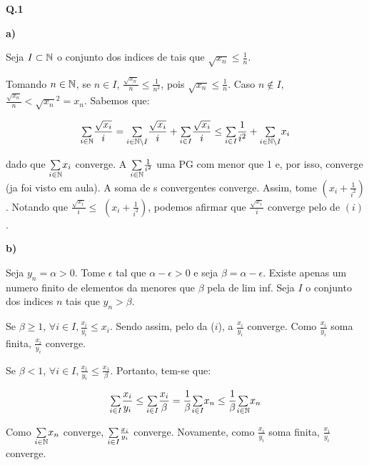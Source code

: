 \noindent\textbf{Q.1}

\textbf{a)}

Seja $I \subset \mathbb{N}$ o conjunto dos indices de  tais que $\sqrt{x_n} \leq \frac{1}{n}$.

Tomando $n \in \mathbb{N}$, se $n\in I$, \entao $\frac{\sqrt{x_n}}{n} \leq \frac{1}{n^2}$, pois $\sqrt{x_n} \leq \frac{1}{n}$. Caso $n \notin I$, \entao $\frac{\sqrt{x_n}}{n} < \sqrt{x_n}^2 = x_n$. Sabemos \entao que:

$$\mbox{$\sum\limits_{i \in \mathbb{N}}$}\frac{\sqrt{x_i}}{i} = \mbox{$\sum\limits_{i \in \mathbb{N} \setminus I}$}\frac{\sqrt{x_i}}{i} + \mbox{$\sum\limits_{i \in I}$}\frac{\sqrt{x_i}}{i} \leq \mbox{$\sum\limits_{i \in I}$}\frac{1}{i^2} + \mbox{$\sum\limits_{i \in \mathbb{N}\setminus I}$}x_i$$

\Eh dado que $\mbox{$\sum\limits_{i \in \mathbb{N}}$}x_i$ converge. A \serie $\mbox{$\sum\limits_{i \in \mathbb{N}}$}\frac{1}{i^2}$ \eh uma PG com \razao menor que 1 e, por isso, converge (ja foi visto em aula). A soma de \serie s convergentes \tambem converge. Assim, tome \series{\N} $(x_i + \frac{1}{i^2})$. Notando que \series{\N} $\frac{\sqrt{x_i}}{i} \leq$ \series{\N} $(x_i + \frac{1}{i^2})$, podemos afirmar que $\frac{\sqrt{x_i}}{i}$ converge pelo \criterio de \comparacao $(i)$.

\textbf{b)}

Seja  $y_n = \alpha > 0$. Tome $\epsilon$ tal que $\alpha - \epsilon > 0$ e seja $\beta = \alpha - \epsilon$. Existe apenas um numero finito de elementos da \sequencia {} menores que $\beta$ pela  de lim inf. Seja $I$ o conjunto dos indices $n$ tais que $y_n > \beta$. 

Se $\beta \ge 1$, \entao $\forall i \in I, \frac{x_i}{y_i} \leq x_i$. Sendo assim, pelo \criterio da \comparacao ($i$), a \serie {} $\frac{x_i}{y_i}$ converge. Como  $\frac{x_i}{y_i}$ \eh soma finita, \entao \series{\N} $\frac{x_i}{y_i}$ converge.

Se $\beta < 1$, \entao $\forall i \in I, \frac{x_1}{y_i} \leq \frac{x_1}{\beta}$. Portanto, tem-se que:

$$\mbox{$\sum\limits_{i \in I}$} \frac{x_i}{y_i} \leq \mbox{$\sum\limits_{i \in I}$} \frac{x_i}{\beta} = \frac{1}{\beta} \mbox{$\sum\limits_{i \in I}$} x_n \leq \frac{1}{\beta} \mbox{$\sum\limits_{i \in \mathbb{N}}$} x_n$$

Como $\mbox{$\sum\limits_{i \in \mathbb{N}}$} x_n$ converge, \entao $\mbox{$\sum\limits_{i \in I}$} \frac{x_i}{y_i}$ \tambem converge. Novamente, como  $\frac{x_i}{y_i}$ \eh soma finita, \entao \series{\N} $\frac{x_i}{y_i}$ converge.